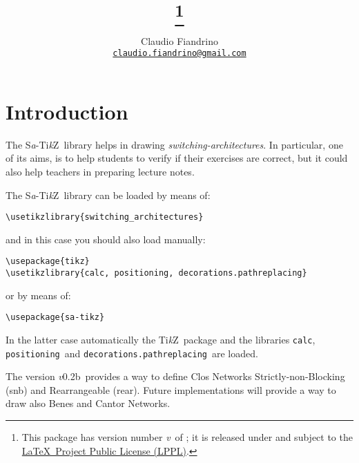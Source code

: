 \documentclass{ltxdoc} %
\title{\saTikZ\footnote{This package has version number \textit{v}\version\ of \versiondate; it is released under and subject to the \href{http://www.latex-project.org/lppl/}{\LaTeX\ Project Public License (LPPL)}.}}
\author{Claudio Fiandrino \\ \small\href{mailto:claudio.fiandrino@gmail.com}{\texttt{claudio.fiandrino@gmail.com}}}
\date{\versiondate}
\newcommand\Tikz{Ti\textit kZ}
\newcommand{\saTikZ}{\textsc S\textit a-\Tikz}
\newcommand{\version}{0.2b}
\begin{document}
\maketitle
\tableofcontents

\section*{Introduction}
The \saTikZ\ library helps in drawing \emph{switching-architectures}. In particular, one of its aims, is to help students to verify if their exercises are correct, but it could also help teachers in preparing lecture notes.

The \saTikZ\ library can be loaded by means of:
\begin{flushleft}
\verb|\usetikzlibrary{|\bgroup\color{red!75!black}\verb|switching_architectures|\egroup\verb|}|
\end{flushleft}
and in this case you should also load manually:
\begin{flushleft}
\verb|\usepackage{|\bgroup\color{red!75!black}\verb|tikz|\egroup\verb|}|\\
\verb|\usetikzlibrary{|\bgroup\color{red!75!black}\verb|calc, positioning, decorations.pathreplacing|\egroup\verb|}|
\end{flushleft}
or by means of:
\begin{flushleft}
\verb|\usepackage{|\bgroup\color{red!75!black}\verb|sa-tikz|\egroup\verb|}|
\end{flushleft}
In the latter case automatically the \Tikz\ package and the libraries \bgroup\color{red!75!black}\verb|calc|\egroup{}, \bgroup\color{red!75!black}\verb|positioning|\egroup\ and \bgroup\color{red!75!black}\verb|decorations.pathreplacing|\egroup\ are loaded.

The version \textit{v}\version\ provides a way to define Clos Networks Strictly-non-Blocking (snb) and Rearrangeable (rear). Future implementations will provide a way to draw also Benes and Cantor Networks.
\end{document}
